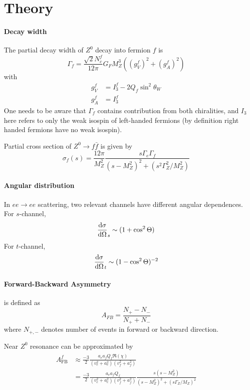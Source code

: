 \section{Theory}
\paragraph{Decay width}
The partial decay width of $Z^0$ decay into fermion $f$ is
\begin{equation}
	\Gamma_f = \frac{ \sqrt{2} N_c^f}{12\pi} G_F M_Z^3 \left( (g_V^f)^2 + (g_A^f)^2  \right)
	\label{math:Gammaf}
\end{equation}
with
\begin{align*}
	g_V^f &= I_3^f - 2 Q_f \sin^2 \theta_W \\
	g_A^f &= I_3^f 
\end{align*}
One needs to be aware that $\Gamma_f$ contains contribution from both chiralities, and $I_3$ here refers to only the weak isospin of left-handed fermions (by definition right handed fermions have no weak isospin).

Partial cross section of $Z^0 \rightarrow f\bar{f}$ is given by~\cite{manual}
\begin{equation}
	\sigma_f(s) = \frac{12 \pi}{M_Z^2} \frac{s \Gamma_e \Gamma_f}{ (s-M_Z^2)^2 + (s^2 \Gamma^2_Z / M_Z^2)}
\end{equation}

\paragraph{Angular distribution}
In $ee \rightarrow ee$ scattering, two relevant channels have different angular dependences. For $s$-channel,
\begin{equation}
	\dv{\sigma}{\Omega}_s \sim (1 + \cos^2 \Theta)
	\label{math:diffCrossS}
\end{equation}
For $t$-channel,
\begin{equation}
	\dv{\sigma}{\Omega}_t \sim (1-\cos^2 \Theta)^{-2}
	\label{math:diffCrossT}
\end{equation}


\paragraph{Forward-Backward Asymmetry} is defined as 
\begin{equation}
	A_{FB} = \frac{N_+ - N_-}{N_+ + N_-}
	\label{math:AFBdef}
\end{equation}
where $N_{+,-}$ denotes number of events in forward or backward direction.

Near $Z^0$ resonance can be approximated by
\begin{align}
	\begin{split}
	A_\text{FB}^f &\approx \frac{-3}{2} \frac{a_e a_f Q_f \Re(\chi)}{(v_e^2 + a_e^2) (v_f^2 + a_f^2)} \\
	&=  \frac{-3}{2} \frac{a_e a_f Q_f }{(v_e^2 + a_e^2) (v_f^2 + a_f^2)} \frac{s(s-M_Z^2)}{(s-M_Z^2)^2 + (s \Gamma_Z / M_Z)^2 }
	\end{split}
	\label{math:AFBgen}
\end{align}

